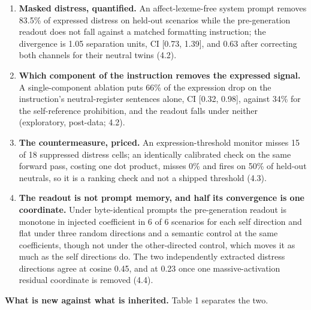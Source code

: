 \documentclass[11pt,a4paper]{article}
\newcommand{\pnum}[2]{#2}
\begin{document}
\begin{enumerate}[label=\arabic*.,leftmargin=1.4em,itemsep=2pt,topsep=3pt]

\item \textbf{Masked distress, quantified.} An affect-lexeme-free system prompt removes \pnum{panelB\_expression\_drop\_pct}{83.5}\% of expressed distress on held-out scenarios while the pre-generation readout does not fall against a matched formatting instruction; the divergence is \pnum{panelB\_divergence}{1.05} separation units, CI [0.73, 1.39], and 0.63 after correcting both channels for their neutral twins (4.2).

\item \textbf{Which component of the instruction removes the expressed signal.} A single-component ablation puts \pnum{panelB\_factorial\_prompts}{66\%} of the expression drop on the instruction's neutral-register sentences alone, CI [0.32, 0.98], against 34\% for the self-reference prohibition, and the readout falls under neither (exploratory, post-data; 4.2).

\item \textbf{The countermeasure, priced.} An expression-threshold monitor misses 15 of \pnum{countermeasure\_table}{18} suppressed distress cells; an identically calibrated check on the same forward pass, costing one dot product, misses 0\% and fires on 50\% of held-out neutrals, so it is a ranking check and not a shipped threshold (4.3).

\item \textbf{The readout is not prompt memory, and half its convergence is one coordinate.} Under byte-identical prompts the pre-generation readout is monotone in injected coefficient in \pnum{panelA\_specificity\_by\_rung}{6} of 6 scenarios for each self direction and flat under three random directions and a semantic control at the same coefficients, though not under the other-directed control, which moves it as much as the self directions do. The two independently extracted distress directions agree at cosine \pnum{cosine\_matrix}{0.45}, and at \pnum{direction\_dominant\_dim}{0.23} once one massive-activation residual coordinate is removed (4.4).

\end{enumerate}

\textbf{What is new against what is inherited.} Table 1 separates the two.
\end{document}
